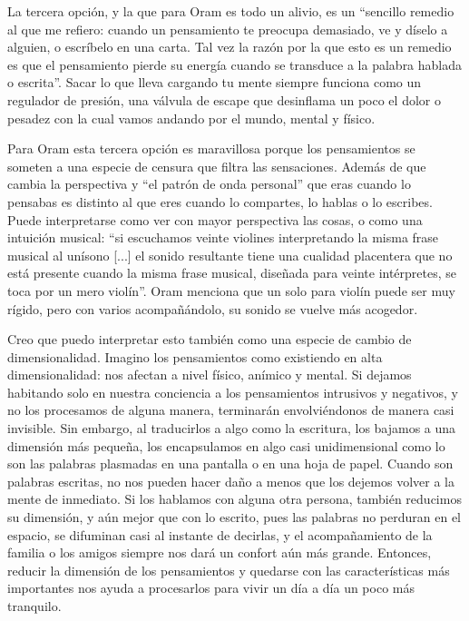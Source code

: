 La tercera opción, y la que para Oram es todo un alivio, es un ``sencillo remedio al que me refiero: cuando un pensamiento te 
preocupa demasiado, ve y díselo a alguien, o escríbelo en una carta. Tal vez la razón por la que esto es un remedio es que el 
pensamiento pierde su energía cuando se transduce a la palabra hablada o escrita''. Sacar lo que lleva cargando tu mente siempre
funciona como un regulador de presión, una válvula de escape que desinflama un poco el dolor o pesadez con la cual vamos andando
por el mundo, mental y físico. 

Para Oram esta tercera opción es maravillosa porque los pensamientos se someten a una especie de censura que filtra las sensaciones. Además de que
cambia la perspectiva y ``el patrón de onda personal'' que eras cuando lo pensabas es distinto al que eres cuando lo compartes, lo
hablas o lo escribes. Puede interpretarse como ver con mayor perspectiva las cosas, o como una intuición musical: ``si escuchamos veinte 
violines interpretando la misma frase musical al unísono [...] el sonido resultante tiene una cualidad placentera que no está presente
cuando la misma frase musical, diseñada para veinte intérpretes, se toca por un mero violín''. Oram menciona que un solo para violín
puede ser muy rígido, pero con varios acompañándolo, su sonido se vuelve más acogedor. 

Creo que puedo interpretar esto también como una especie de cambio de dimensionalidad. Imagino los pensamientos como existiendo en alta 
dimensionalidad: nos afectan a nivel físico, anímico y mental. Si dejamos habitando solo en nuestra conciencia a los pensamientos intrusivos y negativos, 
y no los procesamos de alguna manera, terminarán envolviéndonos de manera casi invisible. Sin embargo, al traducirlos a algo como la escritura, los 
bajamos a una dimensión más pequeña, los encapsulamos en algo casi unidimensional como lo son las palabras plasmadas en una pantalla o en una hoja
de papel. Cuando son palabras escritas, no nos pueden hacer daño a menos que los dejemos volver a la mente de inmediato. Si los hablamos con 
alguna otra persona, también reducimos su dimensión, y aún mejor que con lo escrito, pues las palabras no perduran en el espacio, se difuminan casi 
al instante de decirlas, y el acompañamiento de la familia o los amigos siempre nos dará un confort aún más grande. Entonces, reducir la dimensión de
los pensamientos y quedarse con las características más importantes nos ayuda a procesarlos para vivir un día a día un poco más tranquilo. 

